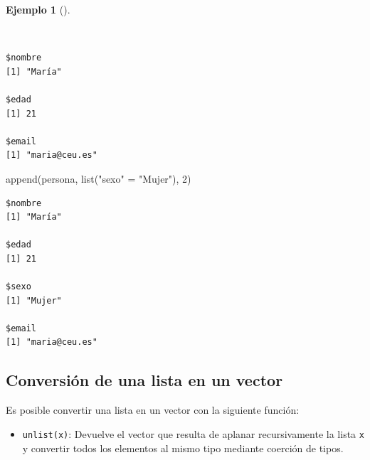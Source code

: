 \documentclass[
  a4paper,
]{scrreport}
\newenvironment{Shaded}{\begin{snugshade}}{\end{snugshade}}
\newcommand{\DecValTok}[1]{\textcolor[rgb]{0.68,0.00,0.00}{#1}}
\newcommand{\FunctionTok}[1]{\textcolor[rgb]{0.28,0.35,0.67}{#1}}
\newcommand{\NormalTok}[1]{\textcolor[rgb]{0.00,0.23,0.31}{#1}}
\newcommand{\OtherTok}[1]{\textcolor[rgb]{0.00,0.23,0.31}{#1}}
\newcommand{\SpecialCharTok}[1]{\textcolor[rgb]{0.37,0.37,0.37}{#1}}
\newcommand{\StringTok}[1]{\textcolor[rgb]{0.13,0.47,0.30}{#1}}
\providecommand{\tightlist}{%
  \setlength{\itemsep}{0pt}\setlength{\parskip}{0pt}}\usepackage{longtable,booktabs,array}
\theoremstyle{definition}
\theoremstyle{definition}
\newtheorem{example}{Ejemplo}[chapter]
\theoremstyle{remark}
\begin{document}
\begin{example}[]\protect\hypertarget{exm-añadir-elementos-listas}{}\label{exm-añadir-elementos-listas}

~

\begin{Shaded}
\end{Shaded}

\begin{verbatim}
$nombre
[1] "María"

$edad
[1] 21

$email
[1] "maria@ceu.es"
\end{verbatim}

\begin{Shaded}
\begin{Highlighting}[]
\FunctionTok{append}\NormalTok{(persona, }\FunctionTok{list}\NormalTok{(}\StringTok{"sexo"} \OtherTok{=} \StringTok{"Mujer"}\NormalTok{), }\DecValTok{2}\NormalTok{)}
\end{Highlighting}
\end{Shaded}

\begin{verbatim}
$nombre
[1] "María"

$edad
[1] 21

$sexo
[1] "Mujer"

$email
[1] "maria@ceu.es"
\end{verbatim}

\end{example}

\hypertarget{conversiuxf3n-de-una-lista-en-un-vector}{%
\subsection{Conversión de una lista en un
vector}\label{conversiuxf3n-de-una-lista-en-un-vector}}

Es posible convertir una lista en un vector con la siguiente función:

\begin{itemize}
\tightlist
\item
  \texttt{unlist(x)}: Devuelve el vector que resulta de aplanar
  recursivamente la lista \texttt{x} y convertir todos los elementos al
  mismo tipo mediante coerción de tipos.
\end{itemize}
\end{document}
